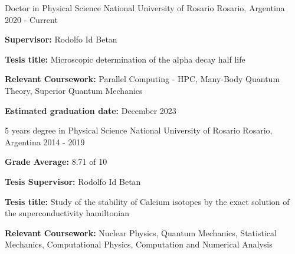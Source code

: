 

\begin{cventries}

  \cventry
    {Doctor in Physical Science} %
    {National University of Rosario} %
    {Rosario, Argentina} %
    {2020 - Current} %
    {
      \begin{cvitems} %
        \item {\textbf{Supervisor:} Rodolfo Id Betan}
        \item {\textbf{Tesis title:} Microscopic determination of the alpha decay half life}
        \item {\textbf{Relevant Coursework:} Parallel Computing - HPC, Many-Body Quantum Theory, Superior Quantum Mechanics }
        \item {\textbf{Estimated graduation date:} December 2023}
      \end{cvitems}
    }
  \cventry
    {5 years degree in Physical Science} %
    {National University of Rosario} %
    {Rosario, Argentina} %
    {2014 - 2019} %
    {
      \begin{cvitems} %
        \item {\textbf{Grade Average:} 8.71 of 10}
        \item {\textbf{Tesis Supervisor:} Rodolfo Id Betan}
        \item {\textbf{Tesis title:} Study of the stability of Calcium isotopes by the exact solution of the superconductivity hamiltonian}
        \item {\textbf{Relevant Coursework:} Nuclear Physics, Quantum Mechanics,  Statistical Mechanics, Computational Physics, Computation and Numerical Analysis}
      \end{cvitems}
    }
\end{cventries}
